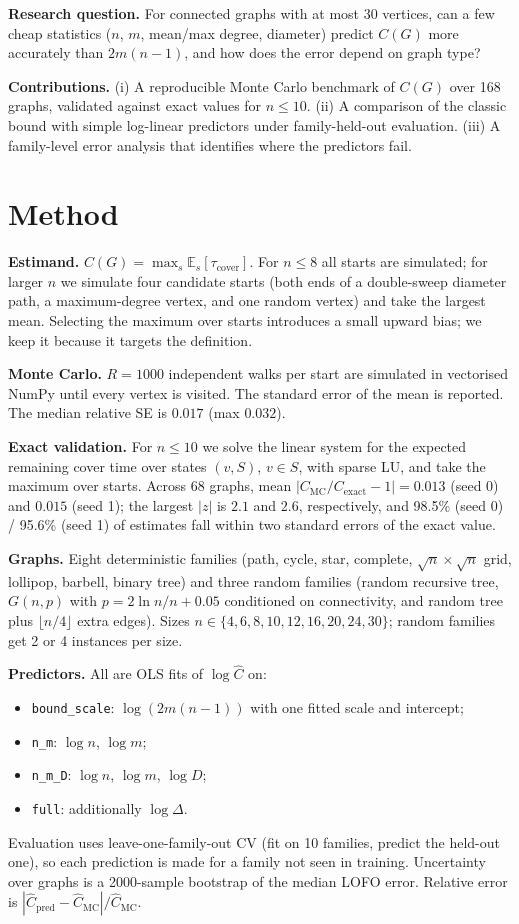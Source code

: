\documentclass[10pt]{article}
\begin{document}
\textbf{Research question.} For connected graphs with at most 30 vertices, can a few cheap
statistics ($n$, $m$, mean/max degree, diameter) predict $C(G)$ more accurately than
$2m(n-1)$, and how does the error depend on graph type?

\textbf{Contributions.} (i) A reproducible Monte Carlo benchmark of $C(G)$ over 168 graphs,
validated against exact values for $n\le 10$. (ii) A comparison of the classic bound with
simple log-linear predictors under family-held-out evaluation. (iii) A family-level error
analysis that identifies where the predictors fail.

\section{Method}
\textbf{Estimand.} $C(G)=\max_{s} \mathbb{E}_s[\tau_{\text{cover}}]$. For $n\le 8$ all starts are
simulated; for larger $n$ we simulate four candidate starts (both ends of a double-sweep diameter
path, a maximum-degree vertex, and one random vertex) and take the largest mean. Selecting the
maximum over starts introduces a small upward bias; we keep it because it targets the definition.

\textbf{Monte Carlo.} $R=1000$ independent walks per start are simulated in vectorised NumPy until
every vertex is visited. The standard error of the mean is reported. The median relative SE is
$0.017$ (max $0.032$).

\textbf{Exact validation.} For $n\le 10$ we solve the linear system for the expected remaining
cover time over states $(v,S)$, $v\in S$, with sparse LU, and take the maximum over starts.
Across 68 graphs, mean $|C_{\text{MC}}/C_{\text{exact}}-1|=0.013$ (seed 0) and $0.015$ (seed 1);
the largest $|z|$ is $2.1$ and $2.6$, respectively, and 98.5\% (seed 0) / 95.6\% (seed 1) of
estimates fall within two standard errors of the exact value.

\textbf{Graphs.} Eight deterministic families (path, cycle, star, complete, $\sqrt n\times\sqrt n$ grid,
lollipop, barbell, binary tree) and three random families (random recursive tree, $G(n,p)$ with
$p=2\ln n/n+0.05$ conditioned on connectivity, and random tree plus $\lfloor n/4\rfloor$ extra edges).
Sizes $n\in\{4,6,8,10,12,16,20,24,30\}$; random families get 2 or 4 instances per size.

\textbf{Predictors.} All are OLS fits of $\log \hat C$ on:
\begin{itemize}
\item \texttt{bound\_scale}: $\log(2m(n-1))$ with one fitted scale and intercept;
\item \texttt{n\_m}: $\log n$, $\log m$;
\item \texttt{n\_m\_D}: $\log n$, $\log m$, $\log D$;
\item \texttt{full}: additionally $\log \Delta$.
\end{itemize}
Evaluation uses leave-one-family-out CV (fit on 10 families, predict the held-out one), so each
prediction is made for a family not seen in training. Uncertainty over graphs is a 2000-sample
bootstrap of the median LOFO error. Relative error is $|\hat C_{\text{pred}}-\hat C_{\text{MC}}|/\hat C_{\text{MC}}$.
\end{document}
